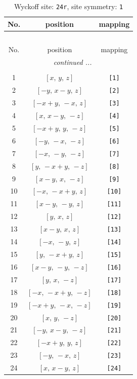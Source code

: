 \documentclass[fleqn,8pt]{jsarticle}
\begin{document}
\begin{longtable}{ccc}
\caption{Wyckoff site: {\tt 24r}, site symmetry: {\tt 1}}
 \\
 \hline \hline
No. & position & mapping \\ \hline \endfirsthead

\multicolumn{2}{l}{\tablename\ \thetable{}} \\
 \hline \hline
No. & position & mapping \\ \hline \endhead

 \hline \hline
\multicolumn{2}{r}{\footnotesize\it continued ...} \\ \endfoot

 \hline \hline
\multicolumn{2}{r}{} \\ \endlastfoot

1 & $\left[ x,\, y,\, z \right]$ & {\tt [1]} \\ \hline
2 & $\left[ - y,\, x - y,\, z \right]$ & {\tt [2]} \\ \hline
3 & $\left[ - x + y,\, - x,\, z \right]$ & {\tt [3]} \\ \hline
4 & $\left[ x,\, x - y,\, - z \right]$ & {\tt [4]} \\ \hline
5 & $\left[ - x + y,\, y,\, - z \right]$ & {\tt [5]} \\ \hline
6 & $\left[ - y,\, - x,\, - z \right]$ & {\tt [6]} \\ \hline
7 & $\left[ - x,\, - y,\, - z \right]$ & {\tt [7]} \\ \hline
8 & $\left[ y,\, - x + y,\, - z \right]$ & {\tt [8]} \\ \hline
9 & $\left[ x - y,\, x,\, - z \right]$ & {\tt [9]} \\ \hline
10 & $\left[ - x,\, - x + y,\, z \right]$ & {\tt [10]} \\ \hline
11 & $\left[ x - y,\, - y,\, z \right]$ & {\tt [11]} \\ \hline
12 & $\left[ y,\, x,\, z \right]$ & {\tt [12]} \\ \hline
13 & $\left[ x - y,\, x,\, z \right]$ & {\tt [13]} \\ \hline
14 & $\left[ - x,\, - y,\, z \right]$ & {\tt [14]} \\ \hline
15 & $\left[ y,\, - x + y,\, z \right]$ & {\tt [15]} \\ \hline
16 & $\left[ x - y,\, - y,\, - z \right]$ & {\tt [16]} \\ \hline
17 & $\left[ y,\, x,\, - z \right]$ & {\tt [17]} \\ \hline
18 & $\left[ - x,\, - x + y,\, - z \right]$ & {\tt [18]} \\ \hline
19 & $\left[ - x + y,\, - x,\, - z \right]$ & {\tt [19]} \\ \hline
20 & $\left[ x,\, y,\, - z \right]$ & {\tt [20]} \\ \hline
21 & $\left[ - y,\, x - y,\, - z \right]$ & {\tt [21]} \\ \hline
22 & $\left[ - x + y,\, y,\, z \right]$ & {\tt [22]} \\ \hline
23 & $\left[ - y,\, - x,\, z \right]$ & {\tt [23]} \\ \hline
24 & $\left[ x,\, x - y,\, z \right]$ & {\tt [24]} \\
\end{longtable}
\end{document}
